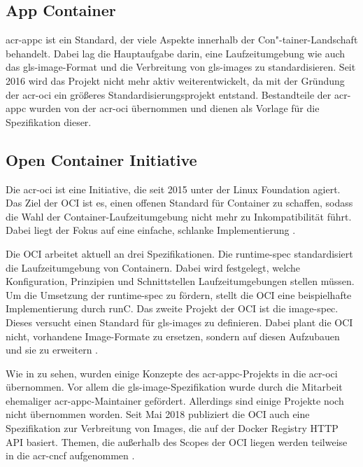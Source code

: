 \subsection{App Container}
\label{sec:appc}
\Gls{acr-appc} ist ein Standard, der viele Aspekte innerhalb der Con"-tainer-Landschaft behandelt. Dabei lag die Hauptaufgabe darin, eine Laufzeitumgebung wie auch das \gls{gls-image}-Format und die Verbreitung von \glspl{gls-image} zu standardisieren. Seit 2016 wird das Projekt nicht mehr aktiv weiterentwickelt, da mit der Gründung der \gls{acr-oci} ein größeres Standardisierungsprojekt entstand. Bestandteile der \gls{acr-appc} wurden von der \gls{acr-oci} übernommen und dienen als Vorlage für die Spezifikation dieser.

\subsection{Open Container Initiative}
\label{sec:oci}
Die \gls{acr-oci} ist eine Initiative, die seit 2015 unter der Linux Foundation agiert. Das Ziel der OCI ist es, einen offenen Standard für Container zu schaffen, sodass die Wahl der Container-Laufzeitumgebung nicht mehr zu Inkompatibilität führt. Dabei liegt der Fokus auf eine einfache, schlanke Implementierung \citep{OpenContainerInitiative}. 

Die OCI arbeitet aktuell an drei Spezifikationen. Die runtime-spec standardisiert die Laufzeitumgebung  von Containern. Dabei wird festgelegt, welche Konfiguration, Prinzipien und Schnittstellen Laufzeitumgebungen stellen müssen. Um die Umsetzung der runtime-spec zu fördern, stellt die OCI eine beispielhafte Implementierung durch runC. Das zweite Projekt der OCI ist die image-spec. Dieses versucht einen Standard für \glspl{gls-image} zu definieren. Dabei plant die OCI nicht, vorhandene Image-Formate zu ersetzen, sondern auf diesen Aufzubauen und sie zu erweitern \citep{OpenContainerInitiative}.

Wie in  zu sehen, wurden einige Konzepte des \gls{acr-appc}-Projekts in die \gls{acr-oci} übernommen. Vor allem die \gls{gls-image}-Spezifikation wurde durch die Mitarbeit ehemaliger \gls{acr-appc}-Maintainer gefördert. Allerdings sind einige Projekte noch nicht übernommen worden. Seit Mai 2018 publiziert die OCI auch eine Spezifikation zur Verbreitung von Images, die auf der Docker Registry HTTP API basiert. Themen, die außerhalb des Scopes der OCI liegen werden teilweise in die \gls{acr-cncf} aufgenommen \citep{MakingSenseofContainerStandardsandFoundations:OCICNCFAppcandRkt}.

